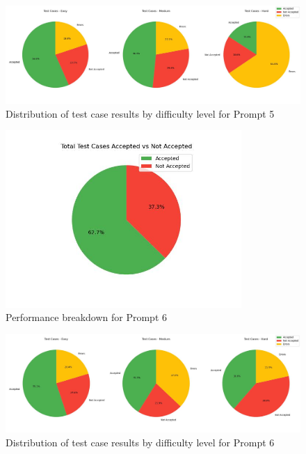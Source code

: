 \begin{figure}[H]
    \centering
    \includegraphics[width=1\textwidth]{figures/5/pie_difficulty.jpg}
    \caption{Distribution of test case results by difficulty level for Prompt 5}
    \label{fig:prompt5_difficulty}
\end{figure}

\begin{figure}[H]
    \centering
    \includegraphics[width=0.8\textwidth]{figures/6/total_accepted_not.jpg}
    \caption{Performance breakdown for Prompt 6}
    \label{fig:prompt6_performance}
\end{figure}

\begin{figure}[H]
    \centering
    \includegraphics[width=1\textwidth]{figures/6/pie_difficulty.jpg}
    \caption{Distribution of test case results by difficulty level for Prompt 6}
    \label{fig:prompt6_difficulty}
\end{figure}


